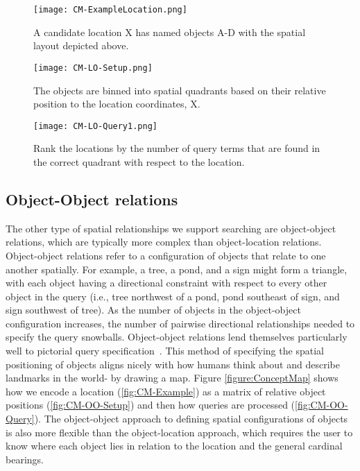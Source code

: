 \begin{figure*}[h]
    \centering
    \begin{subfigure}[t]{.25\textwidth}
        \texttt{[image: CM-ExampleLocation.png]}
        \caption{\small A candidate location X has named objects A-D with the spatial layout depicted above.} 
        \label{fig:CM-LO-Example}
    \end{subfigure}
    \hfill
    \begin{subfigure}[t]{.25\textwidth}
        \texttt{[image: CM-LO-Setup.png]}
        \caption{\small The objects are binned into spatial quadrants based on their relative position to the location coordinates, X.} 
        \label{fig:CM-LO-Setup}
    \end{subfigure}
    \hfill
        \begin{subfigure}[t]{.25\textwidth}
        \texttt{[image: CM-LO-Query1.png]}
        \caption{\small Rank the locations by the number of query terms that are found in the correct quadrant with respect to the location.}
        \label{fig:CM-LO-Query}
    \hfill
    \end{subfigure}
    \caption{\textbf{Object-Location Search Method. A Location-centric data structure (Figure \ref{fig:CM-LO-Setup}) is generated based on the cardinal relations between the objects and the location (Figure \ref{fig:CM-LO-Example}). Then a pictorial query is matched against the structure (Figure \ref{fig:CM-LO-Query}).}}\label{figure:ConceptMap-LO} 
\end{figure*}



\subsection{Object-Object relations}

The other type of spatial relationships we support searching are object-object relations, which are typically more complex than object-location relations.
Object-object relations refer to a configuration of objects that relate to one another spatially.
For example, a tree, a pond, and a sign might form a triangle, with each object having a directional constraint with respect to every other object in the query (i.e., tree northwest of a pond, pond southeast of sign, and sign southwest of tree).
As the number of objects in the object-object configuration increases, the number of pairwise directional relationships needed to specify the query snowballs. 
Object-object relations lend themselves particularly well to pictorial query specification~\cite{Soffer1997}.
This method of specifying the spatial positioning of objects aligns nicely with how humans think about and describe landmarks in the world- by drawing a map. 
Figure \ref{figure:ConceptMap} shows how we encode a location (\ref{fig:CM-Example}) as a matrix of relative object positions (\ref{fig:CM-OO-Setup}) and then how queries are processed (\ref{fig:CM-OO-Query}).
The object-object approach to defining spatial configurations of objects is also more flexible than the object-location approach, which requires the user to know where each object lies in relation to the location and the general cardinal bearings. 

